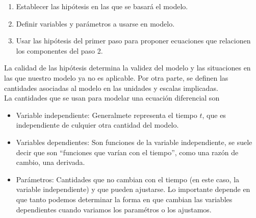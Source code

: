 \documentclass[10pt,a4paper,notitlepage]{report}
\begin{document}
\begin{enumerate}
\item Establecer las hipótesis en las que se basará el modelo. 
\item Definir variables y parámetros a usarse en modelo.
\item Usar las hipótesis del primer paso para proponer ecuaciones que relacionen los componentes del paso 2.
\end{enumerate}
La calidad de las hipótesis determina la validez del modelo y las situaciones en las que nuestro modelo ya no es aplicable. Por otra parte, se definen las cantidades asociadas al modelo en las unidades y escalas implicadas.\\
La cantidades que se usan para modelar una ecuación diferencial son
\begin{itemize}
\item Variable independiente: Generalmete representa el tiempo $t$, que es independiente de culquier otra cantidad del modelo.
\item Variables dependientes: Son funciones de la variable independiente, se suele decir que son ``funciones que varían con el tiempo'', como una razón de cambio, una derivada.
\item Parámetros: Cantidades que no cambian con el tiempo (en este caso, la variable independiente) y que pueden ajustarse. Lo importante depende en que tanto podemos determinar la forma en que cambian las variables dependientes cuando variamos los paramétros o los ajustamos.
\end{itemize}
\end{document}
